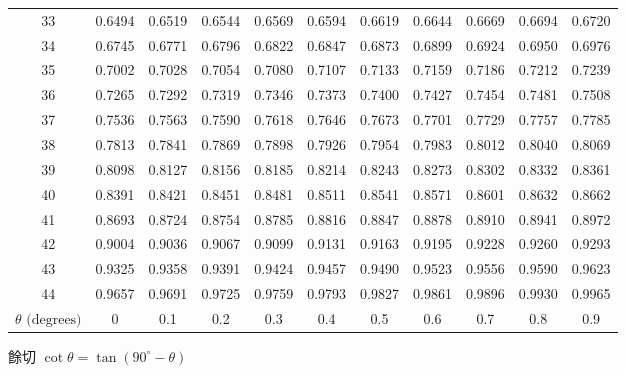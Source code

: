 {\begin{tabular}{|c|cccccccccc|}
33 & 0.6494 & 0.6519 & 0.6544 & 0.6569 & 0.6594 & 0.6619 & 0.6644 & 0.6669 & 0.6694 & 0.6720 \\
34 & 0.6745 & 0.6771 & 0.6796 & 0.6822 & 0.6847 & 0.6873 & 0.6899 & 0.6924 & 0.6950 & 0.6976 \\
\hline
35 & 0.7002 & 0.7028 & 0.7054 & 0.7080 & 0.7107 & 0.7133 & 0.7159 & 0.7186 & 0.7212 & 0.7239 \\
36 & 0.7265 & 0.7292 & 0.7319 & 0.7346 & 0.7373 & 0.7400 & 0.7427 & 0.7454 & 0.7481 & 0.7508 \\
37 & 0.7536 & 0.7563 & 0.7590 & 0.7618 & 0.7646 & 0.7673 & 0.7701 & 0.7729 & 0.7757 & 0.7785 \\
38 & 0.7813 & 0.7841 & 0.7869 & 0.7898 & 0.7926 & 0.7954 & 0.7983 & 0.8012 & 0.8040 & 0.8069 \\
39 & 0.8098 & 0.8127 & 0.8156 & 0.8185 & 0.8214 & 0.8243 & 0.8273 & 0.8302 & 0.8332 & 0.8361 \\
\hline
40 & 0.8391 & 0.8421 & 0.8451 & 0.8481 & 0.8511 & 0.8541 & 0.8571 & 0.8601 & 0.8632 & 0.8662 \\
41 & 0.8693 & 0.8724 & 0.8754 & 0.8785 & 0.8816 & 0.8847 & 0.8878 & 0.8910 & 0.8941 & 0.8972 \\
42 & 0.9004 & 0.9036 & 0.9067 & 0.9099 & 0.9131 & 0.9163 & 0.9195 & 0.9228 & 0.9260 & 0.9293 \\
43 & 0.9325 & 0.9358 & 0.9391 & 0.9424 & 0.9457 & 0.9490 & 0.9523 & 0.9556 & 0.9590 & 0.9623 \\
44 & 0.9657 & 0.9691 & 0.9725 & 0.9759 & 0.9793 & 0.9827 & 0.9861 & 0.9896 & 0.9930 & 0.9965 \\
\hline
$\theta\text{ (degrees)}$ & 0 & 0.1 & 0.2 & 0.3 & 0.4 & 0.5 & 0.6 & 0.7 & 0.8 & 0.9 \\ \hline
\end{tabular}\par}
\vspace{0.5em}\begin{center}\small 餘切 $\cot\theta = \tan(90^\circ - \theta)$\end{center}
\clearpage

